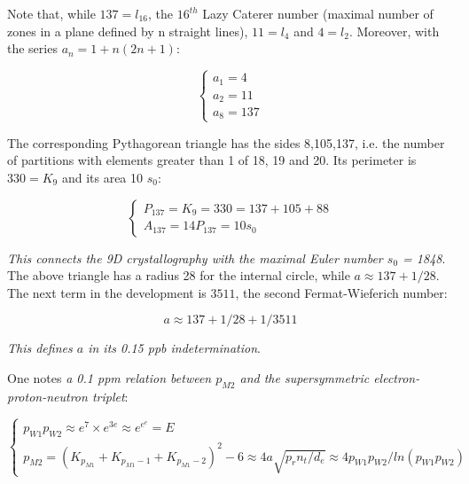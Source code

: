 \documentclass[a4paper,9pt]{article}
\begin{document}
Note that, while $137 = l_{16}$, the $16^{th}$ Lazy Caterer number (maximal number of zones in a plane defined by n straight lines), $11 = l_4$ and $4 = l_2$. Moreover, with the series $a_n = 1 + n(2n+1)$:

\begin{equation}
 \left\{
    \begin{array}{ll}
  a_1 = 4 \\
 a_2 = 11\\
 a_8 = 137
    \end{array}
\right.
\end{equation}

The corresponding Pythagorean triangle has the sides 8,105,137, i.e. the number of partitions with elements greater than 1 of 18, 19 and 20. Its perimeter is $330 = K_9$ and its area 10 $s_0$:


\begin{equation}
 \left\{
    \begin{array}{ll}
   P_{137} = K_9 = 330 = 137 + 105 + 88 \\
 A_{137}  = 14 P_{137} = 10 s_0
    \end{array}
\right.
\end{equation}

\textit{This connects the 9D crystallography with the maximal Euler number $s_0$ = 1848}. The above triangle has a radius 28 for the internal circle, while $a \approx 137 + 1/28$. The next term in the development is $3511 $, the second Fermat-Wieferich number: \cite{Ribenboim}

\begin{equation}
a \approx 137 + 1/28 + 1/3511
\end{equation}

\textit {This defines $a$ in its 0.15 ppb indetermination}. 

One notes \textit {a 0.1 ppm relation between $p_{M2}$ and the supersymmetric electron-proton-neutron triplet}:


\begin{equation}
 \left\{
    \begin{array}{ll}
    p_{W1} p_{W2} \approx e^7 \times e^{3e} \approx  e^{e^e} = E\\
    
         p_{M2} = (K_{p_{M1}} + K_{p_{M1}-1} + K_{p_{M1}-2})^2 - 6 \approx 4a \sqrt {p_rn_t/d_e} \approx 4 p_{W1} p_{W2}/ln(p_{W1} p_{W2})     

    \end{array}
\right.
\end{equation}
\end{document}
